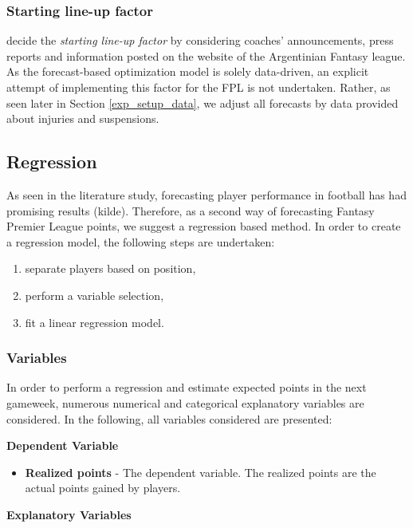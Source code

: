 \subsubsection{Starting line-up factor}

\cite{Bonomo} decide the \textit{starting line-up factor} by considering coaches' announcements, press reports and information posted on the website of the Argentinian Fantasy league. As the forecast-based optimization model is solely data-driven, an explicit attempt of implementing this factor for the FPL is not undertaken. Rather, as seen later in Section \ref{exp_setup_data}, we adjust all forecasts by data provided about injuries and suspensions.

\subsection{Regression}
\label{Sol_approach_regression}

As seen in the literature study, forecasting player performance in football has had promising results (kilde). Therefore, as a second way of forecasting Fantasy Premier League points, we suggest a regression based method. In order to create a regression model, the following steps are undertaken:
\begin{enumerate} [label=(\roman*)]
    \item separate players based on position,
    \item perform a variable selection,
    \item fit a linear regression model.
\end{enumerate}

\subsubsection{Variables}
In order to perform a regression and estimate expected points in the next gameweek, numerous numerical and categorical explanatory variables are considered. In the following, all variables considered are presented: 

\newpar

\textbf{Dependent Variable}
\begin{itemize}
    \item \textbf{Realized points} - The dependent variable. The realized points are the actual points gained by players.
\end{itemize}

\textbf{Explanatory Variables}

